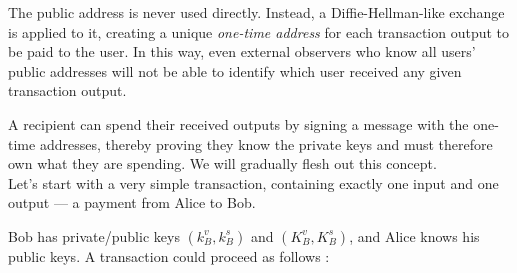 The public address is never used directly. Instead, a Diffie-Hellman-like exchange is applied to it, creating a unique {\em one-time address} for each transaction output to be paid to the user. In this way, even external observers who know all users’ public addresses will not be able to identify which user received any given transaction output.

A recipient can spend their received outputs by signing a message with the one-time addresses, thereby proving they know the private keys and must therefore own what they are spending. We will gradually flesh out this concept.
\\

Let’s start with a very simple transaction, containing exactly one input and one output --- a payment from Alice to Bob.

Bob has private/public keys $(k_B^v, k_B^s)$ and $(K_B^v, K_B^s)$, and Alice knows his public keys. A transaction could proceed as follows \cite{cryptoNoteWhitePaper}:


